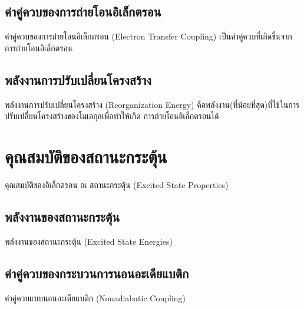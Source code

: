 \subsection{ค่าคู่ควบของการถ่ายโอนอิเล็กตรอน}
\label{ssec:et_coupling}

ค่าคู่ควบของการถ่ายโอนอิเล็กตรอน (Electron Transfer Coupling) เป็นค่าคู่ควบที่เกิดขึ้นจากการถ่ายโอนอิเล็กตรอน

\subsection{พลังงานการปรับเปลี่ยนโครงสร้าง}
\label{ssec:reor_ener}

พลังงานการปรับเปลี่ยนโครงสร้าง (Reorganization Energy) คือพลังงาน(ที่น้อยที่สุด)ที่ใช้ในการปรับเปลี่ยนโครงสร้างของโมเลกุลเพื่อทำให้เกิด%
การถ่ายโอนอิเล็กตรอนได้

\section{คุณสมบัติของสถานะกระตุ้น}
\label{sec:ex_prop}

คุณสมบัติของอิเล็กตรอน ณ สถานะกระตุ้น (Excited State Properties)

\subsection{พลังงานของสถานะกระตุ้น}
\label{ssec:ex_ener}

พลังงานของสถานะกระตุ้น (Excited State Energies)

\subsection{ค่าคู่ควบของกระบวนการนอนอะเดียแบติก}
\label{ssec:nonadia_ener}

ค่าคู่ควบแบบนอนอะเดียแบติก (Nonadiabatic Coupling)
